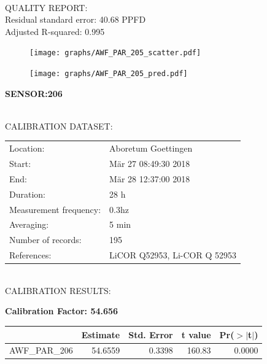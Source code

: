 \documentclass[oneside]{report}
\begin{document}
\hrulefill\\
QUALITY REPORT:\\
Residual standard error: 40.68 PPFD\\
Adjusted R-squared: 0.995



\begin{figure}[H]
  \centering
  \texttt{[image: graphs/AWF\_PAR\_205\_scatter.pdf]}
\end{figure}




\begin{figure}[H]
  \centering
  \texttt{[image: graphs/AWF\_PAR\_205\_pred.pdf]}
\end{figure}

\pagebreak


\begin{center}
\large{\textbf{SENSOR:206}}\\
\end{center}

\hrulefill\\
CALIBRATION DATASET:\\
\begin{table}[h!]
  \centering
  \label{tab:table1}
  \begin{tabular}{ll}
    Location: & Aboretum Goettingen\\ 
    
    
    Start:  & Mär 27 08:49:30 2018 \\
    End:   & Mär 28 12:37:00 2018\\ 
    Duration: & 28 h\\
    Measurement frequency: & 0.3hz\\
    Averaging:  &5 min\\
    Number of records: & 195 \\
    References: & LiCOR Q52953, Li-COR Q 52953 \\
  \end{tabular}
\end{table}

\hrulefill\\
CALIBRATION RESULTS:\\


\begin{center}
\textbf{\large{Calibration Factor: 54.656}}\\
\end{center}
\begin{table}[ht]
\centering
\begin{tabular}{rrrrr}
  \hline
 & Estimate & Std. Error & t value & Pr($>$$|$t$|$) \\ 
  \hline
AWF\_PAR\_206 & 54.6559 & 0.3398 & 160.83 & 0.0000 \\ 
   \hline
\end{tabular}
\end{table}
\end{document}
